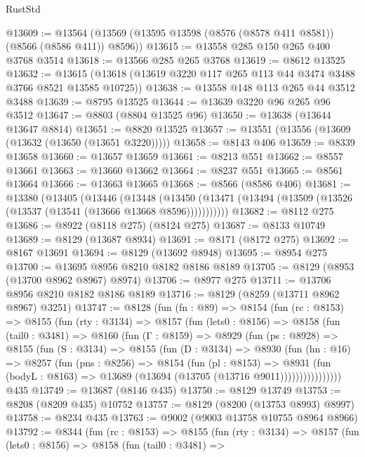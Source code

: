 \begin{lexlean}{RustStd}
\begin{coremodule}
@13609 := @13564 (@13569 (@13595 @13598 (@8576 (@8578 @411 @8581)) (@8566 (@8586 @411)) @8596))
@13615 := @13558 @285 @150 @265 @400 @3768 @3514
@13618 := @13566 @285 @265 @3768
@13619 := @8612 @13525
@13632 := @13615 (@13618 (@13619 @3220 @117 @265 @113 @44 @3474 @3488 @3766 @8521 @13585 @10725))
@13638 := @13558 @148 @113 @265 @44 @3512 @3488
@13639 := @8795 @13525
@13644 := @13639 @3220 @96 @265 @96 @3512
@13647 := @8803 (@8804 @13525 @96)
@13650 := @13638 (@13644 @13647 @8814)
@13651 := @8820 @13525
@13657 := @13551 (@13556 (@13609 (@13632 (@13650 (@13651 @3220)))))
@13658 := @8143 @406
@13659 := @8339 @13658
@13660 := @13657 @13659
@13661 := @8213 @551
@13662 := @8557 @13661
@13663 := @13660 @13662
@13664 := @8237 @551
@13665 := @8561 @13664
@13666 := @13663 @13665
@13668 := @8566 (@8586 @406)
@13681 := @13380
    (@13405
      (@13446
        (@13448
          (@13450 (@13471 (@13494 (@13509 (@13526 (@13537 (@13541 (@13666 @13668 @8596)))))))))))
@13682 := @8112 @275
@13686 := @8922 (@8118 @275) (@8124 @275)
@13687 := @8133 @10749
@13689 := @8129 (@13687 @8934)
@13691 := @8171 (@8172 @275)
@13692 := @8167 @13691
@13694 := @8129 (@13692 @8948)
@13695 := @8954 @275
@13700 := @13695 @8956 @8210 @8182 @8186 @8189
@13705 := @8129 (@8953 (@13700 @8962 @8967) @8974)
@13706 := @8977 @275
@13711 := @13706 @8956 @8210 @8182 @8186 @8189
@13716 := @8129 (@8259 (@13711 @8962 @8967) @3251)
@13747 := @8128
    (fun (fn : @89) =>
    @8154
      (fun (rc : @8153) =>
      @8155
        (fun (rty : @3134) =>
        @8157
          (fun (lets0 : @8156) =>
          @8158
            (fun (tail0 : @3481) =>
            @8160
              (fun (Γ : @8159) =>
              @8929
                (fun (ps : @8928) =>
                @8155
                  (fun (S : @3134) =>
                  @8155
                    (fun (D : @3134) =>
                    @8930
                      (fun (hn : @16) =>
                      @8257
                        (fun (pns : @8256) =>
                        @8154
                          (fun (pl : @8153) =>
                          @8931
                            (fun (bodyL : @8163) =>
                            @13689 (@13694 (@13705 (@13716 @9011))))))))))))))))
    @435
@13749 := @13687 (@8146 @435)
@13750 := @8129 @13749
@13753 := @8208 (@8209 @435) @10752
@13757 := @8129 (@8200 (@13753 @8993) @8997)
@13758 := @8234 @435
@13763 := @9002 (@9003 @13758 @10755 @8964 @8966)
@13792 := @8344
    (fun (rc : @8153) =>
    @8155
      (fun (rty : @3134) =>
      @8157
        (fun (lets0 : @8156) =>
        @8158
          (fun (tail0 : @3481) =>

\end{coremodule}
\end{lexlean}
